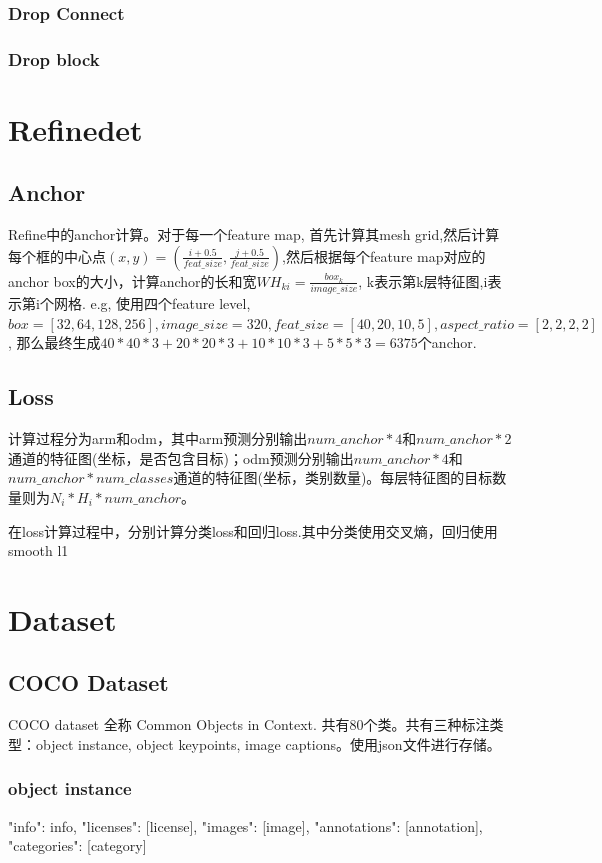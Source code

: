 \documentclass{article}
\begin{document}
\subsubsection{Drop Connect}
\subsubsection{Drop block}


\section{Refinedet}
\subsection{Anchor}
Refine中的anchor计算。对于每一个feature map, 首先计算其mesh grid,然后计算每个框的中心点$(x,y)=(\frac{i+0.5}{feat\_size},\frac{j+0.5}{feat\_size})$,然后根据每个feature map对应的anchor box的大小，计算anchor的长和宽$WH_{ki}=\frac{box_k}{image\_size}$, k表示第k层特征图,i表示第i个网格. e.g, 使用四个feature level, $box=[32,64,128,256], image\_size=320, feat\_size=[40,20,10,5], aspect\_ ratio=[2,2,2,2]$, 那么最终生成$40*40*3+20*20*3+10*10*3+5*5*3=6375$个anchor.

\subsection{Loss}
计算过程分为arm和odm，其中arm预测分别输出$num\_anchor*4$和$num\_anchor*2$通道的特征图(坐标，是否包含目标)；odm预测分别输出$num\_anchor*4$和$num\_anchor*num\_classes$通道的特征图(坐标，类别数量)。每层特征图的目标数量则为$N_i*H_i*num\_anchor$。

在loss计算过程中，分别计算分类loss和回归loss.其中分类使用交叉熵，回归使用smooth l1



\section{Dataset}
\subsection{COCO Dataset}
COCO dataset 全称 Common Objects in Context. 共有80个类。共有三种标注类型：object instance, object keypoints, image captions。使用json文件进行存储。
\subsubsection{object instance}
{
    "info": info,
    "licenses": [license],
    "images": [image],
    "annotations": [annotation],
    "categories": [category]
}
\end{document}
